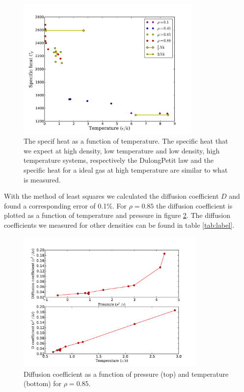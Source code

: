 \documentclass{article}
\begin{document}
\begin{figure}[!htb]
  \centering
    \includegraphics[height=70mm]{cv.pdf}
  \caption[]{The specif heat as a function of temperature. The specific heat that we expect at high density, low temperature and low density, high temperature systems, respectively the Dulong\text{-}Petit law and the specific heat for a ideal gas at high temperature are similar to what is measured.}
  \label{fig:cv}
\end{figure}

With the method of least squares we calculated the diffusion coefficient $D$ and found a corresponding error of 0.1\%. For $\rho=0.85$ the diffusion coefficient is plotted as a function of temperature and pressure in figure \ref{fig:D}. The diffusion coefficients we measured for other densities can be found in table \ref{tab:label}. \\

\begin{figure}[!htb]
  \centering
    \includegraphics[height=70mm]{D.pdf}
  \caption[]{Diffusion coefficient as a function of pressure (top) and temperature (bottom) for $\rho=0.85$.}
  \label{fig:D}
\end{figure}
\end{document}
